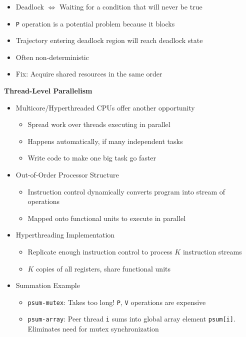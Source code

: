 \documentclass[12pt]{article}
\newcommand{\cname}[1]{\large \textbf{#1}}
\begin{document}
{\begin{itemize}
			\begin{itemize}
				\item Deadlock $\iff$ Waiting for a condition that will never be true
				\item \texttt{P} operation is a potential problem because it blocks
				\item Trajectory entering deadlock region will reach deadlock state
				\item Often non-deterministic
				\item Fix: Acquire shared resources in the same order
			\end{itemize}
		\end{itemize}
		
		\pagebreak
		
		\cname{Thread-Level Parallelism}
		\begin{itemize}
			\item Multicore/Hyperthreaded CPUs offer another opportunity
			\begin{itemize}
				\item Spread work over threads executing in parallel
				\item Happens automatically, if many independent tasks
				\item Write code to make one big task go faster
			\end{itemize}
			\item Out-of-Order Processor Structure
			\begin{itemize}
				\item Instruction control dynamically converts program into stream of operations
				\item Mapped onto functional units to execute in parallel
			\end{itemize}
			\item Hyperthreading Implementation
			\begin{itemize}
				\item Replicate enough instruction control to process $K$ instruction streams
				\item $K$ copies of all registers, share functional units
			\end{itemize}
			\item Summation Example
			\begin{itemize}
				\item \texttt{psum-mutex}: Takes too long! \texttt{P}, \texttt{V} operations are expensive
				\item \texttt{psum-array}: Peer thread \texttt{i} sums into global array element \texttt{psum[i]}. Eliminates need for mutex synchronization

\end{itemize}
\end{itemize}}
\end{document}
